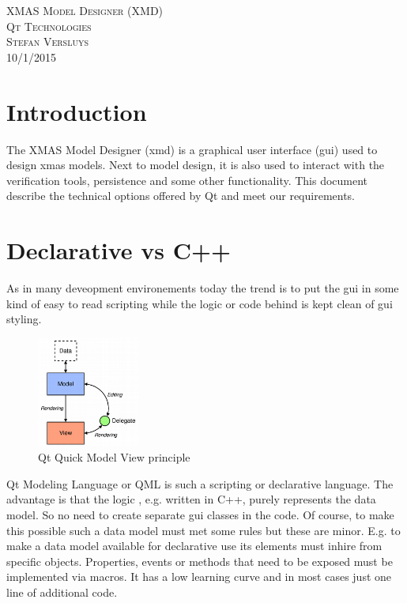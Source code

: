 \documentclass[a4paper,11pt,final]{article}
\begin{document}
\begin{titlepage}
	\vspace*{\fill}
	\begin{center}
		\textsc{\large XMAS Model Designer (XMD)}\\[0.5cm]
		\textsc{\huge Qt Technologies}\\[0.5cm]
		\textsc{Stefan Versluys}\\ \textsc{\scriptsize 10/1/2015}\\[2.0cm]
	\end{center}
	\vspace*{\fill}
\end{titlepage}


\tableofcontents

\section{Introduction}
The XMAS Model Designer (xmd) is a graphical user interface (gui) used to design xmas models. 
Next to model design, it is also used to interact with the verification tools, persistence and 
some other functionality. 
This document describe the technical options offered by Qt and meet our
requirements.

\section{Declarative vs C++}
As in many deveopment environements today the trend is to put the gui in some kind 
of easy to read scripting while the logic or code behind is kept clean of gui styling.

\begin{figure}
	\begin{center}
		\includegraphics[width=0.30\textwidth]{modelview-overview.png}
	\end{center}
	\caption{Qt Quick Model View principle}
	\label{fig:modelview-overview}	
\end{figure}


Qt Modeling Language or QML is such a scripting or declarative language.
The advantage is that the logic , e.g. written in C++, purely represents
the data model. So no need to create separate gui classes in the code.
Of course, to make this possible such a data model must met some rules but these
are minor. E.g. to make a data model available for declarative use its
elements must inhire from specific objects. Properties, events or methods
that need to be exposed must be implemented via macros.
It has a low learning curve and in most cases just one line of
additional code. 
\end{document}

